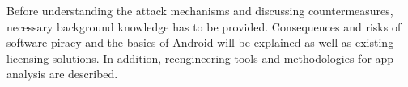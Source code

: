 Before understanding the attack mechanisms and discussing countermeasures, necessary background knowledge has to be provided.
Consequences and risks of software piracy and the basics of Android will be explained as well as existing licensing solutions.
In addition, reengineering tools and methodologies for app analysis are described.
